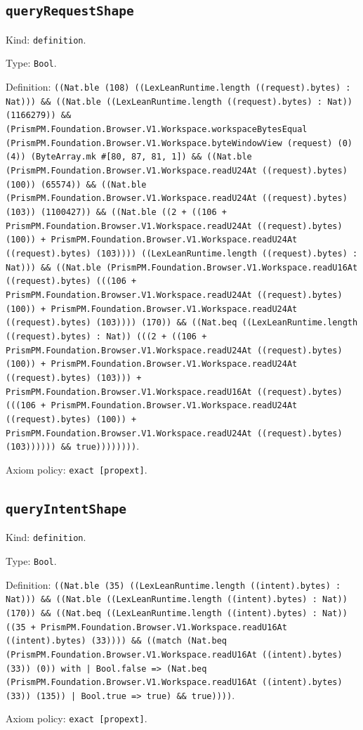 \documentclass[11pt]{article}
\begin{document}
\subsection*{\texttt{queryRequestShape}}
\noindent Kind: \texttt{definition}.\par
\noindent Type: \texttt{Bool}.\par
\noindent Definition: \texttt{((Nat.ble (108) ((LexLeanRuntime.length ((request).bytes) : Nat))) \&\& ((Nat.ble ((LexLeanRuntime.length ((request).bytes) : Nat)) (1166279)) \&\& (PrismPM.Foundation.Browser.V1.Workspace.workspaceBytesEqual (PrismPM.Foundation.Browser.V1.Workspace.byteWindowView (request) (0) (4)) (ByteArray.mk \#[80, 87, 81, 1]) \&\& ((Nat.ble (PrismPM.Foundation.Browser.V1.Workspace.readU24At ((request).bytes) (100)) (65574)) \&\& ((Nat.ble (PrismPM.Foundation.Browser.V1.Workspace.readU24At ((request).bytes) (103)) (1100427)) \&\& ((Nat.ble ((2 + ((106 + PrismPM.Foundation.Browser.V1.Workspace.readU24At ((request).bytes) (100)) + PrismPM.Foundation.Browser.V1.Workspace.readU24At ((request).bytes) (103)))) ((LexLeanRuntime.length ((request).bytes) : Nat))) \&\& ((Nat.ble (PrismPM.Foundation.Browser.V1.Workspace.readU16At ((request).bytes) (((106 + PrismPM.Foundation.Browser.V1.Workspace.readU24At ((request).bytes) (100)) + PrismPM.Foundation.Browser.V1.Workspace.readU24At ((request).bytes) (103)))) (170)) \&\& ((Nat.beq ((LexLeanRuntime.length ((request).bytes) : Nat)) (((2 + ((106 + PrismPM.Foundation.Browser.V1.Workspace.readU24At ((request).bytes) (100)) + PrismPM.Foundation.Browser.V1.Workspace.readU24At ((request).bytes) (103))) + PrismPM.Foundation.Browser.V1.Workspace.readU16At ((request).bytes) (((106 + PrismPM.Foundation.Browser.V1.Workspace.readU24At ((request).bytes) (100)) + PrismPM.Foundation.Browser.V1.Workspace.readU24At ((request).bytes) (103)))))) \&\& true))))))))}.\par
\noindent Axiom policy: \texttt{exact [propext]}.\par
\subsection*{\texttt{queryIntentShape}}
\noindent Kind: \texttt{definition}.\par
\noindent Type: \texttt{Bool}.\par
\noindent Definition: \texttt{((Nat.ble (35) ((LexLeanRuntime.length ((intent).bytes) : Nat))) \&\& ((Nat.ble ((LexLeanRuntime.length ((intent).bytes) : Nat)) (170)) \&\& ((Nat.beq ((LexLeanRuntime.length ((intent).bytes) : Nat)) ((35 + PrismPM.Foundation.Browser.V1.Workspace.readU16At ((intent).bytes) (33)))) \&\& ((match (Nat.beq (PrismPM.Foundation.Browser.V1.Workspace.readU16At ((intent).bytes) (33)) (0)) with | Bool.false => (Nat.beq (PrismPM.Foundation.Browser.V1.Workspace.readU16At ((intent).bytes) (33)) (135)) | Bool.true => true) \&\& true))))}.\par
\noindent Axiom policy: \texttt{exact [propext]}.\par
\end{document}
